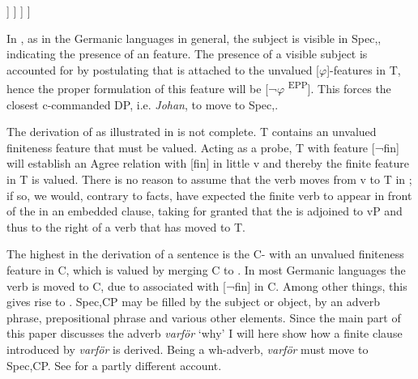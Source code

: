 \documentclass[output=paper]{LSP/langsci}
\begin{document}
\ea%
    \label{ex:platzack:14}
  \begin{forest}
   [\isi{TP}, for tree={align=center, base=top, parent anchor=south, child anchor=north}
    [T\\{[}¬ϕ\textsuperscript{EPP}{]}\\{[}¬fin{]}] [vP
      [DP\\Johan\\{[}ϕ{]}] [v'
	[v\\läste\\{[}fin{]}] [DP\\en roman\\{[}ϕ{]}]
	]
      ]
    ]
   ]
  \end{forest}
\z

In , as in the Germanic languages in general, the subject is visible in Spec,, indicating the presence of an  feature. The presence of a visible subject is accounted for by postulating that  is attached to the unvalued [$\varphi $]-features in T, hence the proper formulation of this feature will be [¬$\varphi $\textsuperscript{ EPP}]. This forces the closest c-commanded DP, i.e. \textit{Johan}, to move to Spec,.   

  The derivation of  as illustrated in  is not complete. T contains an unvalued finiteness feature that must be valued. Acting as a probe, T with feature  [¬fin] will establish an Agree relation with [fin] in little v and thereby the finite feature in T is valued. There is no reason to assume that the verb moves from v to T in ; if so, we would, contrary to facts, have expected the finite verb to appear in front of the  in an embedded clause, taking for granted that the  is adjoined to vP and thus to the right of a verb that has moved to T.

  The highest  in the derivation of a sentence is the C- with an unvalued finiteness feature in C, which is valued by merging C to . In most Germanic languages the  verb is moved to C, due to  associated with [¬fin] in C. Among other things, this gives rise to . Spec,CP may be filled by the subject or object, by an adverb phrase, prepositional phrase and various other elements. Since the main part of this paper discusses the adverb \textit{varför} ‘why’ I will here show how a finite clause introduced by \textit{varför} is derived.  Being a wh-adverb, \textit{varför} must move to Spec,CP. See  \citet{ShlonskySoare2011} for a partly different account.
\end{document}
